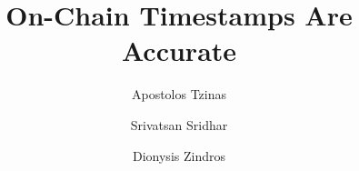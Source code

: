 \title{On-Chain Timestamps Are Accurate}
\ifanonymous{
  \author{}\institute{}
}
\else
\author{
        Apostolos Tzinas \and
        Srivatsan Sridhar  \and
        Dionysis Zindros
}
\fi
